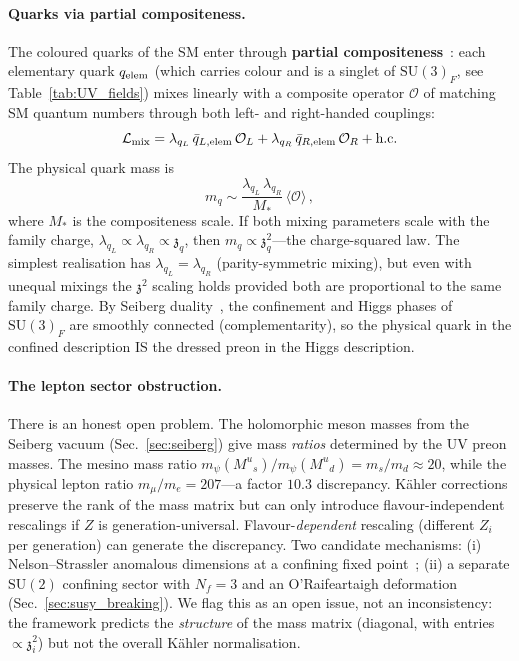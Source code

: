 \documentclass[aps,prd,twocolumn,showpacs,preprintnumbers,superscriptaddress,floatfix]{revtex4-2}
\newcommand{\SU}{\mathrm{SU}}
\newcommand{\Nf}{N_{\!f}}
\newcommand{\zch}{\mathfrak{z}}
\begin{document}
\paragraph{Quarks via partial compositeness.}
The coloured quarks of the SM enter through \textbf{partial
compositeness}~\cite{Kaplan:1991dc}:
each elementary quark $q_{\rm elem}$ (which carries colour and
is a singlet of $\SU(3)_F$, see Table~\ref{tab:UV_fields})
mixes linearly with a composite operator $\mathcal{O}$ of
matching SM quantum numbers through both left- and right-handed
couplings:
\begin{equation}
  \mathcal{L}_{\rm mix} = \lambda_{q_L}\,
  \bar{q}_{L,\rm elem}\,\mathcal{O}_L
  + \lambda_{q_R}\,
  \bar{q}_{R,\rm elem}\,\mathcal{O}_R
  + \text{h.c.}
  \label{eq:partial_comp}
\end{equation}
The physical quark mass is~\cite{Kaplan:1991dc}
\begin{equation}
  m_q \sim \frac{\lambda_{q_L}\,\lambda_{q_R}}{M_*}
  \,\langle\mathcal{O}\rangle\,,
  \label{eq:mq_partial}
\end{equation}
where $M_*$ is the compositeness scale.
If both mixing parameters scale with the family charge,
$\lambda_{q_L} \propto \lambda_{q_R} \propto \zch_q$, then
$m_q \propto \zch_q^2$---the charge-squared law.
The simplest realisation has $\lambda_{q_L} = \lambda_{q_R}$
(parity-symmetric mixing), but even with unequal mixings the
$\zch^2$ scaling holds provided both are proportional to the
same family charge.
By Seiberg duality~\cite{Seiberg:1994bz,CsakiSchmaltzSkiba:1997},
the confinement and Higgs phases of $\SU(3)_F$ are smoothly
connected (complementarity), so the physical quark in the
confined description IS the dressed preon in the Higgs
description.

\paragraph{The lepton sector obstruction.}
There is an honest open problem.
The holomorphic meson masses from the Seiberg vacuum
(Sec.~\ref{sec:seiberg}) give mass \emph{ratios}
determined by the UV preon masses.
The mesino mass ratio
$m_\psi(M^u{}_s)/m_\psi(M^u{}_d) = m_s/m_d \approx 20$,
while the physical lepton ratio $m_\mu/m_e = 207$---a factor
$10.3$ discrepancy.
K\"ahler corrections preserve the rank of the mass matrix but
can only introduce flavour-independent rescalings if $Z$ is
generation-universal.
Flavour-\emph{dependent} rescaling (different $Z_i$ per
generation) can generate the discrepancy.
Two candidate mechanisms:
(i) Nelson--Strassler anomalous dimensions at a confining
fixed point~\cite{NelsonStrassler:2000};
(ii) a separate $\SU(2)$ confining sector with $\Nf = 3$ and
an O'Raifeartaigh deformation (Sec.~\ref{sec:susy_breaking}).
We flag this as an open issue, not an inconsistency: the
framework predicts the \emph{structure} of the mass matrix
(diagonal, with entries $\propto \zch_i^2$) but not the
overall K\"ahler normalisation.
\end{document}
